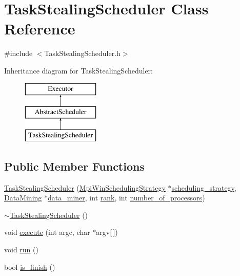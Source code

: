 \hypertarget{class_task_stealing_scheduler}{}\section{Task\+Stealing\+Scheduler Class Reference}
\label{class_task_stealing_scheduler}


{\ttfamily \#include $<$Task\+Stealing\+Scheduler.\+h$>$}

Inheritance diagram for Task\+Stealing\+Scheduler\+:\begin{figure}[H]
\begin{center}
\leavevmode
\includegraphics[height=3.000000cm]{class_task_stealing_scheduler}
\end{center}
\end{figure}
\subsection*{Public Member Functions}
\begin{DoxyCompactItemize}
\item 
\hyperlink{class_task_stealing_scheduler_af893fa98efeda805d0632c77b8a7ea8e}{Task\+Stealing\+Scheduler} (\hyperlink{class_mpi_win_scheduling_strategy}{Mpi\+Win\+Scheduling\+Strategy} $\ast$\hyperlink{class_abstract_scheduler_a7dd11eee79bfb44c820d6c28480fd0c7}{scheduling\+\_\+strategy}, \hyperlink{class_data_mining}{Data\+Mining} $\ast$\hyperlink{class_abstract_scheduler_a6e281d90fa4b965779cd13eabf7d0249}{data\+\_\+miner}, int \hyperlink{class_executor_a33c24e2887b4d9c4ef7f3566d3bc803e}{rank}, int \hyperlink{class_executor_a4e798bde66d26fe200de7e8d2b54e915}{number\+\_\+of\+\_\+processors})
\item 
\hyperlink{class_task_stealing_scheduler_a4ac70e3f8599b547ba886ff895e70d12}{$\sim$\+Task\+Stealing\+Scheduler} ()
\item 
void \hyperlink{class_task_stealing_scheduler_a8e2a2515ccc6021980508ba085f104fa}{execute} (int argc, char $\ast$argv\mbox{[}$\,$\mbox{]})
\item 
void \hyperlink{class_task_stealing_scheduler_a362edbac4a417c08ee8b19a364cc97bb}{run} ()
\item 
bool \hyperlink{class_task_stealing_scheduler_a4d411046663ce0d63f4f70505aa51a2d}{is\+\_\+finish} ()
\end{DoxyCompactItemize}
